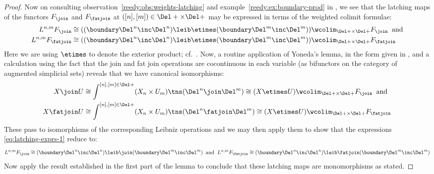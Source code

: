 \begin{proof}
        Now on consulting observation~\ref*{reedy:obs:weights-latching} and example~\ref*{reedy:ex:boundary-prod} in \cite{RiehlVerity:2013kx}, we see that the latching maps of the functors $F_{\join}$ and $F_{\fatjoin}$ at $([n],[m])\in\Del+\times\Del+$ may be expressed in terms of the weighted colimit formulae:
    \begin{equation}\label{eq:latching-exprs-1}
      \begin{aligned}
        L^{n,m} F_{\join} &\cong ((\boundary\Del^n\inc\Del^n)\leib\etimes(\boundary\Del^m\inc\Del^m)) \wcolim_{\Del+\times\Del+} F_{\join} \mkern10mu\text{and}\\
        L^{n,m} F_{\fatjoin} &\cong ((\boundary\Del^n\inc\Del^n)\leib\etimes(\boundary\Del^m\inc\Del^m)) \wcolim_{\Del+\times\Del+} F_{\fatjoin} 
      \end{aligned}
    \end{equation}
    Here we are using $\etimes$ to denote the exterior product; cf.~\cite[\ref*{reedy:obs:box-product}]{RiehlVerity:2013kx}.
   Now, a routine application of Yoneda's lemma, in the form given in \cite[example~\ref{reedy:ex:weighted-yoneda}]{RiehlVerity:2013kx}, and a calculation using the fact that the join and fat join operations are cocontinuous in each variable (as bifunctors on the category of augmented simplicial sets) reveals that we have canonical isomorphisms: 
    \begin{align}
      X\join U &\cong \int^{[n],[m]\in\Del+} (X_n\times U_m)\tns(\Del^n\join\Del^m) \cong (X\etimes U)\wcolim_{\Del+\times\Del+} F_{\join} \mkern10mu\text{and} \notag  \\
      X\fatjoin U &\cong \int^{[n],[m]\in\Del+} (X_n\times U_m)\tns(\Del^n\fatjoin\Del^m) \cong (X\etimes U)\wcolim_{\Del+\times\Del+} F_{\fatjoin}  \label{eq:fatjoinformulae}
    \end{align}
    These pass to isomorphisms of the corresponding Leibniz operations and we may then apply them to show that the expressions \eqref{eq:latching-exprs-1} reduce to:
    \begin{equation*}
      L^{n,m} F_{\join} \cong (\boundary\Del^n\inc\Del^n)\leib\join(\boundary\Del^m\inc\Del^m) \mkern10mu\text{and}\mkern10mu
      L^{n,m} F_{\fatjoin} \cong (\boundary\Del^n\inc\Del^n)\leib\fatjoin(\boundary\Del^m\inc\Del^m)
    \end{equation*}
    Now apply the result established in the first part of the lemma to conclude that these latching maps are monomorphisms as stated.
  \end{proof}

